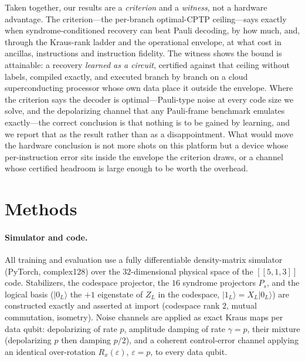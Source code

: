 \documentclass[aps,prxquantum,reprint,superscriptaddress]{revtex4-2}
\newcommand{\ket}[1]{\lvert #1\rangle}
\newcommand{\code}{[\![5,1,3]\!]}
\begin{document}
Taken together, our results are a \emph{criterion} and a \emph{witness}, not a
hardware advantage. The criterion---the per-branch optimal-CPTP ceiling---says
exactly when syndrome-conditioned recovery can beat Pauli decoding, by how much,
and, through the Kraus-rank ladder and the operational envelope, at what cost in
ancillas, instructions and instruction fidelity. The witness shows the bound is
attainable: a recovery \emph{learned as a circuit}, certified against that ceiling
without labels, compiled exactly, and executed branch by branch on a cloud
superconducting processor whose own data place it outside the envelope. Where the
criterion says the decoder is optimal---Pauli-type noise at every code size we
solve, and the depolarizing channel that any Pauli-frame benchmark emulates
exactly---the correct conclusion is that nothing is to be gained by learning, and
we report that as the result rather than as a disappointment. What would move the
hardware conclusion is not more shots on this platform but a device whose
per-instruction error sits inside the envelope the criterion draws, or a channel
whose certified headroom is large enough to be worth the overhead.
\section*{Methods}

\paragraph{Simulator and code.}
All training and evaluation use a fully differentiable density-matrix
simulator (PyTorch, complex128) over the $32$-dimensional physical space of
the $\code$ code. Stabilizers, the codespace projector, the $16$ syndrome
projectors $P_s$, and the logical basis ($\ket{0_L}$ the $+1$ eigenstate of
$Z_L$ in the codespace, $\ket{1_L}=X_L\ket{0_L}$) are constructed exactly and
asserted at import (codespace rank $2$, mutual commutation, isometry).
Noise channels are applied as exact Kraus maps per data qubit: depolarizing
of rate $p$, amplitude damping of rate $\gamma=p$, their mixture (depolarizing
$p$ then damping $p/2$), and a coherent control-error channel applying an
identical over-rotation $R_x(\varepsilon)$, $\varepsilon=p$, to every data
qubit.
\end{document}
